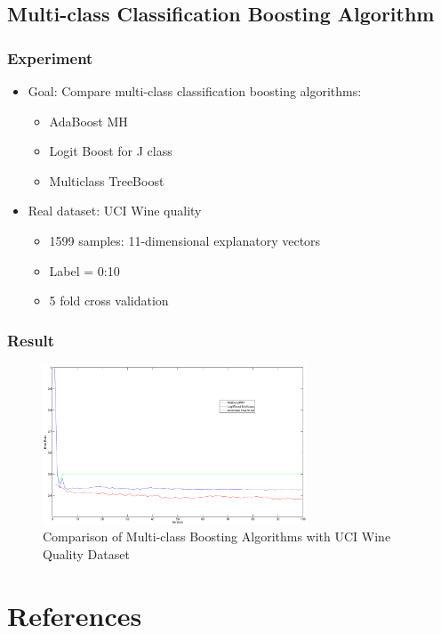 \documentclass[]{beamer}
\begin{document}
\subsection{Multi-class Classification Boosting Algorithm}
\begin{frame}
	\frametitle{Experiment}
	\begin{itemize}
		\item Goal: Compare multi-class classification boosting algorithms:
			\begin{itemize}
				\item AdaBoost MH
				\item Logit Boost for J class
				\item Multiclass TreeBoost
			\end{itemize}

		\item Real dataset: UCI Wine quality
			\begin{itemize}
				\item 1599 samples: 11-dimensional explanatory vectors
				\item Label = 0:10
				\item 5 fold cross validation
			\end{itemize}
	\end{itemize}
\end{frame}
\begin{frame}
	\frametitle{Result}
	\begin{figure}[H]
		\centering
		\caption{Comparison of Multi-class Boosting Algorithms with UCI Wine Quality Dataset}
		\includegraphics[width = 0.7\textwidth]{Figures/wine_quality.eps}
	\end{figure}
\end{frame}



\section*{References}
\end{document}
